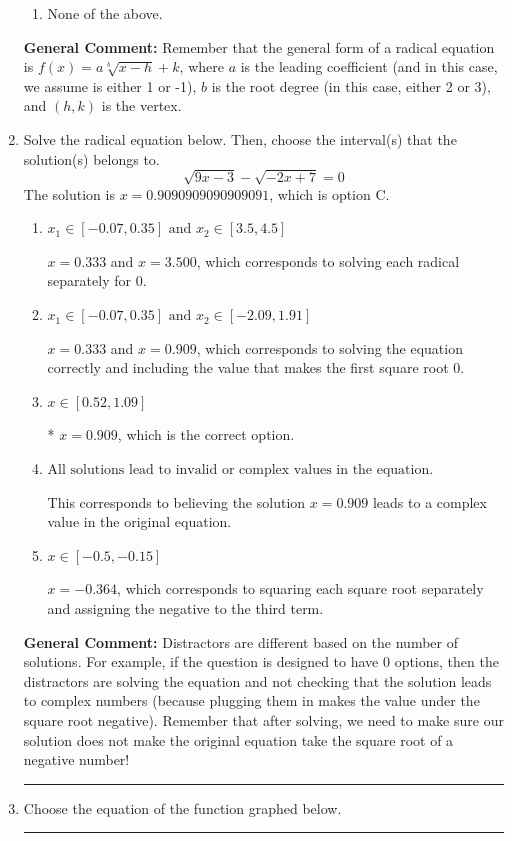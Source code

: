 \documentclass{extbook}[14pt]
\newcommand{\litem}[1]{\item #1

\rule{\textwidth}{0.4pt}}
\begin{document}
\begin{enumerate}
{\begin{enumerate}[label=\Alph*.]
\begin{multicols}{2}
\end{multicols}\item None of the above.\end{enumerate}
\textbf{General Comment:} Remember that the general form of a radical equation is $ f(x) = a \sqrt[b]{x - h} + k $, where $a$ is the leading coefficient (and in this case, we assume is either 1 or -1), $b$ is the root degree (in this case, either 2 or 3), and $(h, k)$ is the vertex.
}
\litem{
Solve the radical equation below. Then, choose the interval(s) that the solution(s) belongs to.
\[ \sqrt{9 x - 3} - \sqrt{-2 x + 7} = 0 \]The solution is \( x = 0.9090909090909091 \), which is option C.\begin{enumerate}[label=\Alph*.]
\item \( x_1 \in [-0.07, 0.35] \text{ and } x_2 \in [3.5,4.5] \)

$x = 0.333$ and $x = 3.500$, which corresponds to solving each radical separately for 0.
\item \( x_1 \in [-0.07, 0.35] \text{ and } x_2 \in [-2.09,1.91] \)

$x = 0.333$ and $x = 0.909$, which corresponds to solving the equation correctly and including the value that makes the first square root 0.
\item \( x \in [0.52,1.09] \)

* $x = 0.909$, which is the correct option.
\item \( \text{All solutions lead to invalid or complex values in the equation.} \)

This corresponds to believing the solution $x = 0.909$ leads to a complex value in the original equation.
\item \( x \in [-0.5,-0.15] \)

$x = -0.364$, which corresponds to squaring each square root separately and assigning the negative to the third term.
\end{enumerate}

\textbf{General Comment:} Distractors are different based on the number of solutions. For example, if the question is designed to have 0 options, then the distractors are solving the equation and not checking that the solution leads to complex numbers (because plugging them in makes the value under the square root negative). Remember that after solving, we need to make sure our solution does not make the original equation take the square root of a negative number!
}
\litem{
Choose the equation of the function graphed below.

}
\end{enumerate}
\end{document}
